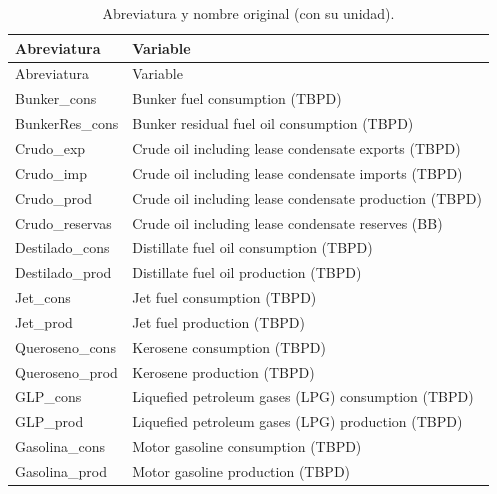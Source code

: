 \documentclass[oneside, openany, fontset=libertinus]{mitthesis}
\begin{document}
\begin{longtable}[]{@{}
  >{\raggedright\arraybackslash}p{}
  >{\raggedright\arraybackslash}p{}@{}}
\caption{Abreviatura y nombre original (con su unidad).}\tabularnewline
\toprule\noalign{}
\begin{minipage}[b]{\linewidth}\raggedright
Abreviatura
\end{minipage} & \begin{minipage}[b]{\linewidth}\raggedright
Variable
\end{minipage} \\
\midrule\noalign{}
\endfirsthead
\toprule\noalign{}
\begin{minipage}[b]{\linewidth}\raggedright
Abreviatura
\end{minipage} & \begin{minipage}[b]{\linewidth}\raggedright
Variable
\end{minipage} \\
\midrule\noalign{}
\endhead
\bottomrule\noalign{}
\endlastfoot
Bunker\_cons & Bunker fuel consumption (TBPD) \\
BunkerRes\_cons & Bunker residual fuel oil consumption (TBPD) \\
Crudo\_exp & Crude oil including lease condensate exports (TBPD) \\
Crudo\_imp & Crude oil including lease condensate imports (TBPD) \\
Crudo\_prod & Crude oil including lease condensate production (TBPD) \\
Crudo\_reservas & Crude oil including lease condensate reserves (BB) \\
Destilado\_cons & Distillate fuel oil consumption (TBPD) \\
Destilado\_prod & Distillate fuel oil production (TBPD) \\
Jet\_cons & Jet fuel consumption (TBPD) \\
Jet\_prod & Jet fuel production (TBPD) \\
Queroseno\_cons & Kerosene consumption (TBPD) \\
Queroseno\_prod & Kerosene production (TBPD) \\
GLP\_cons & Liquefied petroleum gases (LPG) consumption (TBPD) \\
GLP\_prod & Liquefied petroleum gases (LPG) production (TBPD) \\
Gasolina\_cons & Motor gasoline consumption (TBPD) \\
Gasolina\_prod & Motor gasoline production (TBPD) \\

\end{longtable}
\end{document}
